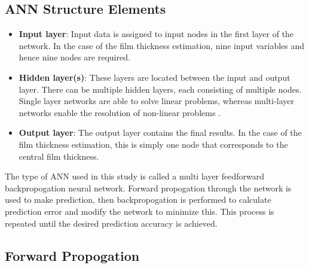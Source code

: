 \subsection{ANN Structure Elements}
\begin{itemize}
	\item \textbf{Input layer}: Input data is assigned to input nodes in the first layer of the network. In the case of the film thickness estimation, nine input variables and hence nine nodes are required.
	\item \textbf{Hidden layer(s)}: These layers are located between the input and output layer. There can be multiple hidden layers, each consisting of multiple nodes. Single layer networks are able to solve linear problems, whereas multi-layer networks enable the resolution of non-linear problems \cite{Bell2014}.
	\item \textbf{Output layer}: The output layer contains the final results. In the case of the film thickness estimation, this is simply one node that corresponds to the central film thickness.
\end{itemize}

The type of ANN used in this study is called a multi layer feedforward backpropogation neural network. Forward propogation through the network is used to make prediction, then backpropogation is performed to calculate prediction error and modify the network to minimize this. This process is repeated until the desired prediction accuracy is achieved.

\subsection{Forward Propogation}

